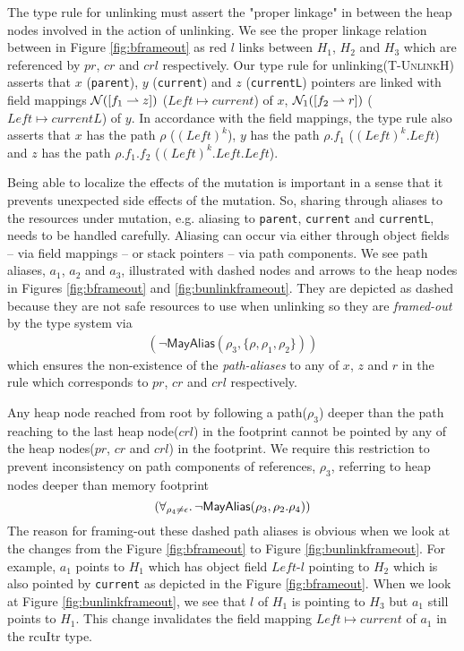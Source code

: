 The type rule for unlinking must assert the "proper linkage" in between the heap nodes involved in the action of unlinking. We see the proper linkage relation between in Figure \ref{fig:bframeout} as red $l$ links between $H_1$, $H_2$ and $H_3$ which are referenced by $pr$, $cr$ and $crl$ respectively. Our type rule for unlinking(\textsc{T-UnlinkH}) asserts that $x$ (\texttt{parent}), $y$ (\texttt{current}) and $z$ (\texttt{currentL}) pointers are linked with field mappings $\mathcal{N}([f_1\rightharpoonup z])$ ($Left \mapsto current$) of $x$, $\mathcal{N}_1([f_2\rightharpoonup r])$ ($Left \mapsto currentL$) of $y$. In accordance with the field mappings, the type rule also asserts that $x$ has the path $\rho$ ($(Left)^{k}$), $y$ has the path $\rho.f_1$ ($(Left)^{k}.Left$) and $z$ has the path $\rho.f_1.f_2$ ($(Left)^{k}.Left.Left$).

Being able to localize the effects of the mutation is important in a sense that it prevents unexpected side effects of the mutation. So, sharing through aliases to the resources under mutation, e.g. aliasing to \texttt{parent}, \texttt{current} and \texttt{currentL}, needs to be handled carefully. Aliasing can occur via either through  object fields -- via field mappings -- or stack pointers -- via path components. We see path aliases, $a_1$, $a_2$ and $a_3$, illustrated with dashed nodes and arrows to the heap nodes in Figures \ref{fig:bframeout} and \ref{fig:bunlinkframeout}. They are depicted as dashed because they are not safe resources to use when unlinking so they are \textit{framed-out} by the type system via
\[
\begin{array}{l}
(\neg\mathsf{MayAlias}(\rho_3,\{\rho,\rho_1,\rho_2\})  ) 
\end{array}
\]
which ensures the non-existence of the \textit{path-aliases} to any of $x$, $z$ and $r$ in the rule which corresponds to $pr$, $cr$ and $crl$ respectively.

Any heap node reached from root by following a path($\rho_3$) deeper than the path reaching to the last heap node($crl$) in the footprint cannot be pointed by any of the heap nodes($pr$, $cr$ and $crl$) in the footprint. We require this restriction to prevent inconsistency on path components of references, $\rho_3$, referring to heap nodes deeper than memory footprint
\[
 (\forall_{\rho_4\neq \epsilon} \ldotp \neg\mathsf{MayAlias}(\rho_3, \rho_2.\rho_4) )
\]
The reason for framing-out these dashed path aliases is obvious when we look at the changes from the Figure \ref{fig:bframeout} to Figure \ref{fig:bunlinkframeout}. For example, $a_1$ points to $H_1$ which has object field $Left$-$l$ pointing to $H_2$ which is also pointed by \texttt{current} as depicted in the Figure \ref{fig:bframeout}. When we look at Figure \ref{fig:bunlinkframeout}, we see that $l$ of $H_1$ is pointing to $H_3$ but $a_1$ still points to $H_1$. This change invalidates the field mapping $Left \mapsto current$ of $a_1$ in the \textsf{rcuItr} type.


